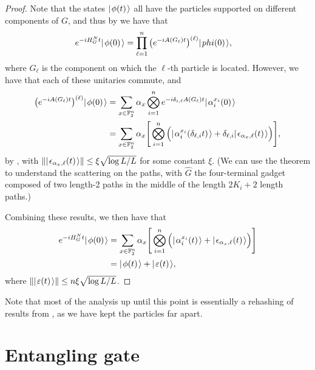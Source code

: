 \documentclass[../thesis-main/thesis-main]{subfiles}
\begin{document}
\begin{proof}
  Note that the states $|\mspace{2mu} \phi(t) \mspace{2mu} \rangle$ all have the particles supported on different components of $G$, and thus by  we have that
  \begin{align}
    e^{-i H_G^N t} |\mspace{2mu} \phi(0) \mspace{2mu} \rangle &= \prod_{\ell=1}^n \big( e^{-i A(G_\ell)t}\big)^{(\ell)} |\mspace{2mu} phi(0) \mspace{2mu} \rangle,
  \end{align}
where $G_\ell$ is the component on which the $\ell$-th particle is located.  However, we have that each of these unitaries commute, and
  \begin{align}
    \big( e^{-i A(G_\ell)t}\big)^{(\ell)} |\mspace{2mu} \phi(0) \mspace{2mu} \rangle&= \sum_{x\in \mathbb{F}_2^n} \alpha_x \bigotimes_{i=1}^n e^{- i \delta_{i,\ell} A(G_\ell) t} |\mspace{2mu} \alpha_i^{x_i}(0) \mspace{2mu} \rangle\\
    & = \sum_{x\in \mathbb{F}_2^n} \alpha_x \Bigg[\bigotimes_{i=1}^n \Big(|\mspace{2mu} \alpha_i^{x_i}(\delta_{\ell,i} t) \mspace{2mu} \rangle + \delta_{\ell,i} |\mspace{2mu} \epsilon_{\alpha_x,\ell}(t) \mspace{2mu} \rangle\Big)\Bigg],
  \end{align}
  by , with $\Vert |\mspace{2mu} \epsilon_{\alpha_x,\ell}(t) \mspace{2mu} \rangle\Vert \leq \xi \sqrt{\log L/L}$ for some constant $\xi$.  (We can use the theorem to understand the scattering on the paths, with $\widehat{G}$ the four-terminal gadget composed of two length-2 paths in the middle of the length $2K_i + 2$ length paths.)
  
  Combining these results, we then have that
  \begin{align}
    e^{-i H_G^N t} |\mspace{2mu} \phi(0) \mspace{2mu} \rangle &= \sum_{x\in \mathbb{F}_2^n} \alpha_x \Bigg[\bigotimes_{i=1}^n \Big(|\mspace{2mu} \alpha_i^{x_i}(t) \mspace{2mu} \rangle + |\mspace{2mu} \epsilon_{\alpha_x,\ell}(t) \mspace{2mu} \rangle\Big)\Bigg]\\
      &= |\mspace{2mu} \phi(t) \mspace{2mu} \rangle + |\mspace{2mu} \varepsilon(t) \mspace{2mu} \rangle,
  \end{align}
  where $\Vert |\mspace{2mu} \varepsilon(t) \mspace{2mu} \rangle\Vert \leq n \xi \sqrt{\log L/L}$.

\end{proof}

Note that most of the analysis up until this point is essentially a rehashing of results from , as we have kept the particles far apart. 




%

\section{Entangling gate}\label{sec:entangling_gate}
\end{document}
